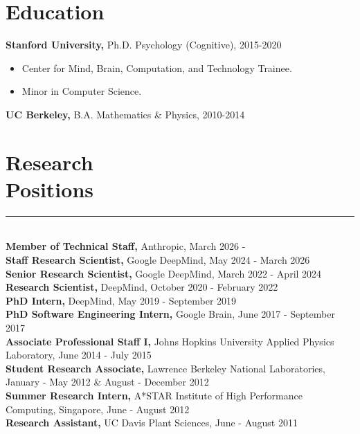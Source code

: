 \documentclass[margin]{res}
\begin{document}
 
 
 
\address{{\bf Email} \\ andrew.lampinen@gmail.com}
\address{{\bf Website} \\\url{https://lampinen.github.io}}
\begin{resume} 
\section{Education} 
{\bf Stanford University,} Ph.D. Psychology (Cognitive), 2015-2020
\begin{itemize} \itemsep -2pt \item Center for Mind, Brain, Computation, and Technology Trainee. \item Minor in Computer Science.\end{itemize}
{\bf UC Berkeley,}  B.A. Mathematics \& Physics, 2010-2014%
\vspace{1pt}\section{Research\\Positions} \vspace{-15pt} \rule{\textwidth}{0.5pt} \\[3pt]
{\bf Member of Technical Staff,} Anthropic, March 2026 - \\[0.1em] 
{\bf Staff Research Scientist,} Google DeepMind, May 2024 - March 2026\\[0.1em] 
{\bf Senior Research Scientist,} Google DeepMind, March 2022 - April 2024\\[0.1em] 
{\bf Research Scientist,} DeepMind, October 2020 - February 2022\\[0.1em]
{\bf PhD Intern,} DeepMind, May 2019 - September 2019\\[0.1em]
{\bf PhD Software Engineering Intern,} Google Brain, June 2017 - September 2017\\[0.1em]
{\bf Associate Professional Staff I,} Johns Hopkins University Applied Physics Laboratory, June 2014 - July 2015\\[0.1em] 
{\bf Student Research Associate,} Lawrence Berkeley National Laboratories, January - May 2012 \& August - December 2012\\[0.1em]
{\bf Summer Research Intern,} A*STAR Institute of High Performance Computing, Singapore, June - August 2012\\[0.1em]
{\bf Research Assistant,} UC Davis Plant Sciences, June - August 2011
\vspace{1pt}

\end{resume}
\end{document}
